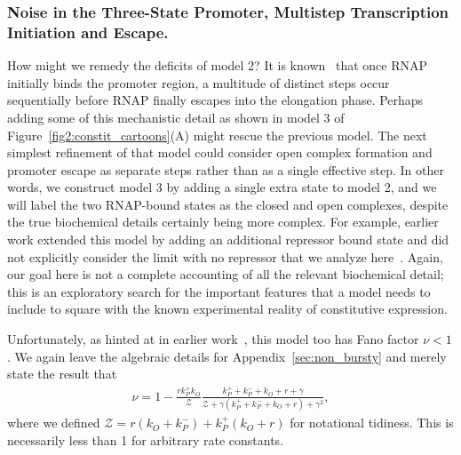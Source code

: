 \subsubsection{Noise in the Three-State Promoter, Multistep Transcription
Initiation and Escape.} 

How might we remedy the deficits of model 2? It is known~\cite{DeHaseth1998}
that once RNAP initially binds the promoter region, a multitude of distinct
steps occur sequentially before RNAP finally escapes into the elongation phase.
Perhaps adding some of this mechanistic detail as shown in model 3 of
Figure~\ref{fig2:constit_cartoons}(A) might rescue the previous model. The next
simplest refinement of that model could consider open complex formation and
promoter escape as separate steps rather than as a single effective step. In
other words, we construct model 3 by adding a single extra state to model 2, and
we will label the two RNAP-bound states as the closed and open complexes,
despite the true biochemical details certainly being more complex. For example,
earlier work extended this model by adding an additional repressor bound state
and did not explicitly consider the limit with no repressor that we analyze
here~\cite{Mitarai2015}. Again, our goal here is not a complete accounting of
all the relevant biochemical detail; this is an exploratory search for the
important features that a model needs to include to square with the known
experimental reality of constitutive expression.

Unfortunately, as hinted at in earlier work~\cite{Mitarai2015}, this model too
has Fano factor $\nu<1$. We again leave the algebraic details for
Appendix~\ref{sec:non_bursty} and merely state the result that
\begin{align}
\nu = 1 - \frac{r k_P^+ k_O}{\mathcal{Z}}
\frac{k_P^+ + k_P^- + k_O + r + \gamma}
    {\mathcal{Z} + \gamma(k_P^+ + k_P^- + k_O + r) + \gamma^2},
\label{eq:model3_fano}
\end{align}
where we defined $\mathcal{Z} = r(k_O + k_P^-) + k_P^+(k_O + r)$ for notational
tidiness. This is necessarily less than 1 for arbitrary rate constants.

